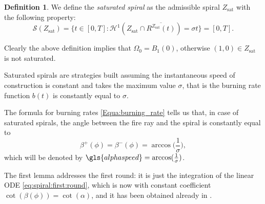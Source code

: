 \documentclass[reqno]{amsart}
\newcounter{assu}
\theoremstyle{definition} \newtheorem{definition}{Definition}[section]
\theoremstyle{definition} \newtheorem{remark}[definition]{Remark}
\theoremstyle{plain} \newtheorem{lemma}[definition]{Lemma}
\theoremstyle{plain} \newtheorem{proposition}[definition]{Proposition}
\theoremstyle{plain} \newtheorem{theorem}[definition]{Theorem}
\theoremstyle{plain} \newtheorem{corollary}[definition]{Corollary}
\theoremstyle{definition} \newtheorem{example}[definition]{Example}
\theoremstyle{plain} \newtheorem{claim}[clai]{Claim}
\theoremstyle{definition} \newtheorem{assumption}[definition]{Assumption}
\theoremstyle{definition} \newtheorem{observation}[definition]{Observation}
\newcommand{\1}{\mathbbm 1}
\renewcommand{\H}{\mathscr H}
\renewcommand{\i}{\imath}
\numberwithin{equation}{section} %
\theoremstyle{plain} \newtheorem*{theorem*}{Theorem}
\theoremstyle{plain} \newtheorem{mthm}[maintheorem]{Main Theorem}
\theoremstyle{plain} \newtheorem*{mthm*}{Main Theorem}
\theoremstyle{plain} \newtheorem*{conjecture*}{Conjecture}
\theoremstyle{plain} \newtheorem{conjecture}[definition]{Conjecture}
\theoremstyle{plain} \newtheorem*{problem*}{Problem}
\begin{document}
\begin{definition}
\label{Def:satur_spiral}
We define the \emph{saturated spiral} as the admissible spiral $Z_\mathrm{sat}$ with the following property:
\begin{equation*}
\mathcal{S}(Z_\mathrm{sat}) = \big\{ t \in [0,T] : \H^1(Z_\mathrm{sat} \cap \overline{R^{Z_\mathrm{sat}}(t)}) = \sigma t \big\} = [0,T].
\end{equation*}
\end{definition}

Clearly the above definition implies that $\Omega_0 = B_1(0)$, otherwise $(1,0) \in Z_\mathrm{sat}$ is not saturated.

Saturated spirals are strategies built assuming the instantaneous speed of construction is constant and takes the maximum value $\sigma$, that is the burning rate function $b(t)$ is constantly equal to $\sigma$.

The formula for burning rates \eqref{Equa:burning_rate} tells us that, in case of saturated spirals, the angle between the fire ray and the spiral is constantly equal to
$$
\beta^+(\phi) = \beta^-(\phi) = \arccos \bigg( \frac{1}{\sigma} \bigg),
$$
which will be denoted by  $\gls{alphaspeed} = \arccos(\frac{1}{\sigma})$. %

The first lemma addresses the first round: it is just the integration of the linear ODE \eqref{eq:spiral:first:round}, which is now with constant coefficient $\cot(\beta(\phi)) = \cot(\alpha)$, and it has been obtained already in \cite{firefighter}.

%
\end{document}

